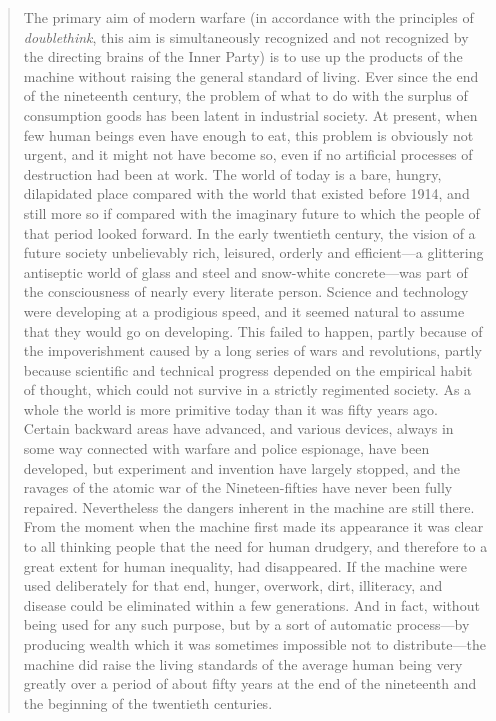 \begin{paracol}{2}
\begin{quotation}
The primary aim of modern warfare (in accordance with the principles of
\emph{doublethink}, this aim is simultaneously recognized and not
recognized by the directing brains of the Inner Party) is to use up the
products of the machine without raising the general standard of living.
Ever since the end of the nineteenth century, the problem of what to do
with the surplus of consumption goods has been latent in industrial
society. At present, when few human beings even have enough to eat, this
problem is obviously not urgent, and it might not have become so, even
if no artificial processes of destruction had been at work. The world of
today is a bare, hungry, dilapidated place compared with the world that
existed before 1914, and still more so if compared with the imaginary
future to which the people of that period looked forward. In the early
twentieth century, the vision of a future society unbelievably rich,
leisured, orderly and efficient---a glittering antiseptic world of glass
and steel and snow-white concrete---was part of the consciousness of
nearly every literate person. Science and technology were developing at
a prodigious speed, and it seemed natural to assume that they would go
on developing. This failed to happen, partly because of the
impoverishment caused by a long series of wars and revolutions, partly
because scientific and technical progress depended on the empirical
habit of thought, which could not survive in a strictly regimented
society. As a whole the world is more primitive today than it was fifty
years ago. Certain backward areas have advanced, and various devices,
always in some way connected with warfare and police espionage, have
been developed, but experiment and invention have largely stopped, and
the ravages of the atomic war of the Nineteen-fifties have never been
fully repaired. Nevertheless the dangers inherent in the machine are
still there. From the moment when the machine first made its appearance
it was clear to all thinking people that the need for human drudgery,
and therefore to a great extent for human inequality, had disappeared.
If the machine were used deliberately for that end, hunger, overwork,
dirt, illiteracy, and disease could be eliminated within a few
generations. And in fact, without being used for any such purpose, but
by a sort of automatic process---by producing wealth which it was
sometimes impossible not to distribute---the machine did raise the
living standards of the average human being very greatly over a period
of about fifty years at the end of the nineteenth and the beginning of
the twentieth centuries.
\end{quotation}


\end{paracol}
